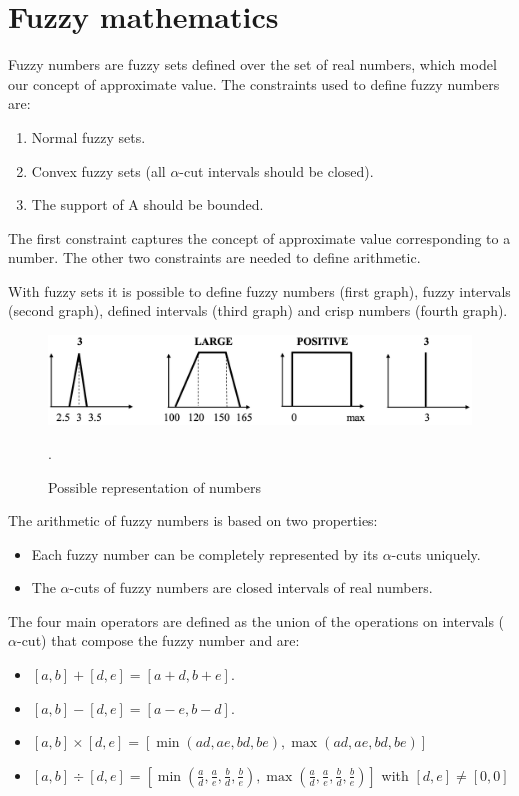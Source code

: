 \documentclass[12pt, a4paper]{report}
\newtheorem[L]{theorem}{Theorem}
\newtheorem[M]{corollary}{Corollary}
\newtheorem[M]{lemma}{Lemma}
\newtheorem[style=S,bodystyle=\normalfont]{definition}{Definition}
\begin{document}
    \section{Fuzzy mathematics}
    Fuzzy numbers are fuzzy sets defined over the set of real numbers, which model our concept of approximate value. The constraints used to 
    define fuzzy numbers are: 
    \begin{enumerate}
        \item Normal fuzzy sets.
        \item Convex fuzzy sets (all $\alpha$-cut intervals should be closed).
        \item The support of A should be bounded. 
    \end{enumerate}
    The first constraint captures the concept of approximate value corresponding to a number. The other two constraints are needed to define 
    arithmetic. 

    With fuzzy sets it is possible to define fuzzy numbers (first graph), fuzzy intervals (second graph), defined intervals (third graph) and 
    crisp numbers (fourth graph). 
    \begin{figure}[H]
        \centering
        \includegraphics[width=0.75\linewidth]{images/numbers.png}
        \caption{Possible representation of numbers}.
    \end{figure}

    The arithmetic of fuzzy numbers is based on two properties:
    \begin{itemize}
        \item Each fuzzy number can be completely represented by its $\alpha$-cuts uniquely. 
        \item The $\alpha$-cuts of fuzzy numbers are closed intervals of real numbers. 
    \end{itemize}

    The four main operators are defined as the union of the operations on intervals ($\alpha$-cut) that compose the fuzzy number and are: 
    \begin{itemize}
        \item $[a,b]+[d,e]=[a+d,b+e]$.
        \item $[a,b]-[d,e]=[a-e,b-d]$.
        \item $[a,b] \times [d,e]=[\min (ad,ae,bd,be),\max (ad,ae,bd,be)]$
        \item $[a,b] \div [d,e]=[\min (\frac{a}{d},\frac{a}{e},\frac{b}{d},\frac{b}{e}),\max (\frac{a}{d},\frac{a}{e},\frac{b}{d},\frac{b}{e})]$ with $[d,e] \neq [0,0]$
    \end{itemize}
\end{document}
